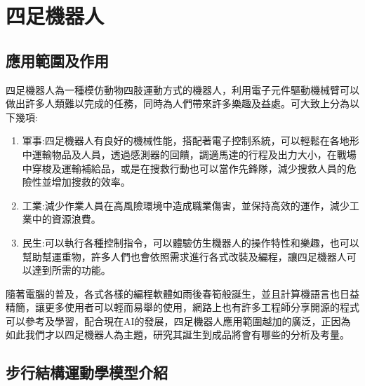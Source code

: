 
\chapter{四足機器人}
\section{應用範圍及作用}
四足機器人為一種模仿動物四肢運動方式的機器人，利用電子元件驅動機械臂可以做出許多人類難以完成的任務，同時為人們帶來許多樂趣及益處。可大致上分為以下幾項:\
\begin{enumerate}
\item 軍事:四足機器人有良好的機械性能，搭配著電子控制系統，可以輕鬆在各地形中運輸物品及人員，透過感測器的回饋，調適馬達的行程及出力大小，在戰場中穿梭及運輸補給品，或是在搜救行動也可以當作先鋒隊，減少搜救人員的危險性並增加搜救的效率。\
\item 工業:減少作業人員在高風險環境中造成職業傷害，並保持高效的運作，減少工業中的資源浪費。\
\item 民生:可以執行各種控制指令，可以體驗仿生機器人的操作特性和樂趣，也可以幫助幫運重物，許多人們也會依照需求進行各式改裝及編程，讓四足機器人可以達到所需的功能。\
\end{enumerate}
隨著電腦的普及，各式各樣的編程軟體如雨後春筍般誕生，並且計算機語言也日益精簡，讓更多使用者可以輕而易舉的使用，網路上也有許多工程師分享開源的程式可以參考及學習，配合現在AI的發展，四足機器人應用範圍越加的廣泛，正因為如此我們才以四足機器人為主題，研究其誕生到成品將會有哪些的分析及考量。\\[6pt]
\newpage
\section{步行結構運動學模型介紹}


